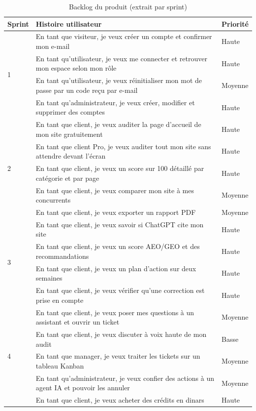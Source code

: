 \begin{table}[htbp]
\centering
\small
\caption{Backlog du produit (extrait par sprint)}\label{tab-backlog}
\begin{tabularx}{\textwidth}{@{}lXl@{}}
\toprule
\textbf{Sprint} & \textbf{Histoire utilisateur} & \textbf{Priorité}\\
\midrule
\multirow{4}{*}{1} & En tant que visiteur, je veux créer un compte et confirmer mon e-mail & Haute\\
 & En tant qu'utilisateur, je veux me connecter et retrouver mon espace selon mon rôle & Haute\\
 & En tant qu'utilisateur, je veux réinitialiser mon mot de passe par un code reçu par e-mail & Moyenne\\
 & En tant qu'administrateur, je veux créer, modifier et supprimer des comptes & Haute\\
\midrule
\multirow{5}{*}{2} & En tant que client, je veux auditer la page d'accueil de mon site gratuitement & Haute\\
 & En tant que client Pro, je veux auditer tout mon site sans attendre devant l'écran & Haute\\
 & En tant que client, je veux un score sur 100 détaillé par catégorie et par page & Haute\\
 & En tant que client, je veux comparer mon site à mes concurrents & Moyenne\\
 & En tant que client, je veux exporter un rapport PDF & Moyenne\\
\midrule
\multirow{4}{*}{3} & En tant que client, je veux savoir si ChatGPT cite mon site & Haute\\
 & En tant que client, je veux un score AEO/GEO et des recommandations & Haute\\
 & En tant que client, je veux un plan d'action sur deux semaines & Haute\\
 & En tant que client, je veux vérifier qu'une correction est prise en compte & Haute\\
\midrule
\multirow{5}{*}{4} & En tant que client, je veux poser mes questions à un assistant et ouvrir un ticket & Moyenne\\
 & En tant que client, je veux discuter à voix haute de mon audit & Basse\\
 & En tant que manager, je veux traiter les tickets sur un tableau Kanban & Moyenne\\
 & En tant qu'administrateur, je veux confier des actions à un agent IA et pouvoir les annuler & Moyenne\\
 & En tant que client, je veux acheter des crédits en dinars & Haute\\
\bottomrule
\end{tabularx}
\end{table}

